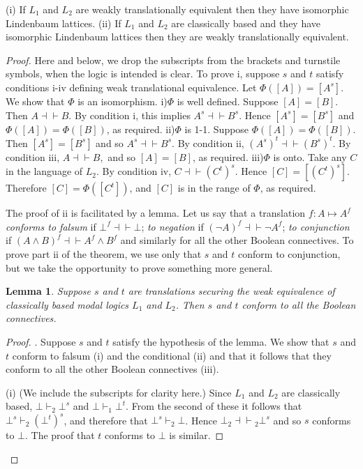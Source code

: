 \documentclass[11pt]{article}
\begin{document}
\begin{theorem}(i) If $L_1$ and $L_2$ are weakly translationally equivalent then they have isomorphic Lindenbaum lattices. (ii) If $L_1$ and $L_2$ are classically based and they have isomorphic Lindenbaum lattices then they are weakly translationally equivalent.
\end{theorem}

\begin{proof}
Here and below, we drop the subscripts from the brackets and turnstile symbols, when the logic is intended is clear. To prove i, suppose $s$ and $t$ satisfy conditions i-iv defining weak translational equivalence. Let $\Phi([A])=[A^s]$. We show that $\Phi$ is an isomorphism.
i)$\Phi$ is well defined. Suppose $[A]=[B]$. Then $A{\dashv}{\vdash}B$. By condition i, this implies $A^s{\dashv}{\vdash}B^s$. Hence $[A^s] = [B^s]$ and $\Phi([A])=\Phi([B])$, as required. 
ii)$\Phi$ is 1-1. Suppose $\Phi([A])=\Phi([B])$. Then $[A^s]=[B^s]$ and so $A^s{\dashv}{\vdash}B^s$. By condition ii, $(A^s)^t{\dashv}{\vdash}(B^s)^t$. By condition iii, $A{\dashv}{\vdash}B,$ and so $[A]=[B]$, as required.
iii)$\Phi$ is onto. Take any $C$ in the language of $L_2$. By condition iv, $C{\dashv}{\vdash}(C^t)^s$. Hence $[C] = [(C^t)^s]$. Therefore $[C]=\Phi([C^t])$, and $[C]$ is in the range of $\Phi$, as required.

The proof of ii is facilitated by a lemma. Let us say that a translation $f\colon A{\mapsto}A^f$ \textit{conforms to falsum} if $\bot^f {\dashv}{\vdash} \bot$; \textit{to negation} if $(\neg A)^f {\dashv}{\vdash} \neg A^f$; \textit{to conjunction} if $(A\wedge B)^f {\dashv}{\vdash}A^f \wedge B^f$ and similarly for all the other Boolean connectives. To prove part ii of the theorem, we use only that $s$ and $t$ conform to conjunction, but we take the opportunity to prove something more general.

\newtheorem*{lemma}{Lemma}
\begin{lemma}Suppose $s$ and $t$ are translations securing the weak equivalence of classically based modal logics $L_1$ and $L_2$. Then $s$ and $t$ conform to all the Boolean connectives. 
\end{lemma}
\begin{proof}. Suppose $s$ and $t$ satisfy the hypothesis of the lemma. We show that $s$ and $t$ conform to falsum (i) and the conditional (ii) and that it follows that they conform to all the other Boolean connectives (iii).

(i) (We include the subscripts for clarity here.) Since $L_1$ and $L_2$ are classically based, $\bot\vdash_2 \bot^s$ and $\bot \vdash_1 \bot^t$. From the second of these it follows that $\bot^s \vdash_2 (\bot^t)^s$, and therefore that $\bot^s \vdash_2 \bot$. Hence $\bot_2\!{\dashv}{\vdash}\!_2 \bot^s$ and so $s$ conforms to $\bot$. The proof that $t$ conforms to $\bot$ is similar.


\end{proof}
\end{proof}
\end{document}
